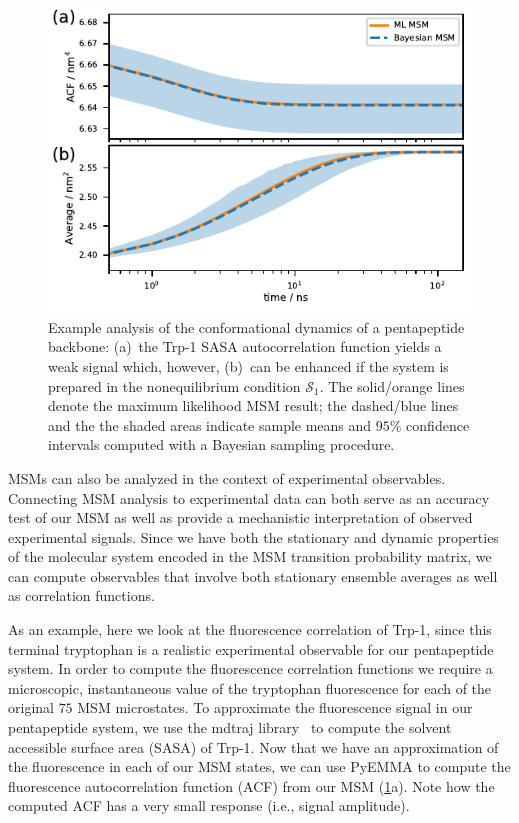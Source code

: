 \documentclass[9pt,tutorial]{livecoms}
\begin{document}
\begin{figure}
\includegraphics{figure_5}
\caption{Example analysis of the conformational dynamics of a pentapeptide backbone: (a)~the Trp-1 SASA autocorrelation function yields a weak signal which, however, (b)~can be enhanced if the system is prepared in the nonequilibrium condition $\mathcal{S}_1$. The solid/orange lines denote the maximum likelihood MSM result; the dashed/blue lines and the the shaded areas indicate sample means and $95\%$ confidence intervals computed with a Bayesian sampling procedure.}
\label{fig:msm-exp-obs}
\end{figure}

MSMs can also be analyzed in the context of experimental observables. Connecting MSM analysis to experimental data can both serve as an accuracy test of our MSM as well as provide a mechanistic interpretation of observed experimental signals.
Since we have both the stationary and dynamic properties of the molecular system encoded in the MSM transition probability matrix, we can compute observables that involve both stationary ensemble averages as well as correlation functions.

As an example, here we look at the fluorescence correlation of Trp-1, since this terminal tryptophan is a realistic experimental observable for our pentapeptide system.
In order to compute the fluorescence correlation functions we require a microscopic, instantaneous value of the tryptophan fluorescence for each of the original $75$ MSM microstates.
To approximate the fluorescence signal in our pentapeptide system, we use the mdtraj library~\cite{mdtraj} to compute the solvent accessible surface area (SASA) of Trp-1.
Now that we have an approximation of the fluorescence in each of our MSM states, we can use PyEMMA to compute the fluorescence autocorrelation function (ACF) from our MSM (\ref{fig:msm-exp-obs}a).
Note how the computed ACF has a very small response (i.e., signal amplitude).
\end{document}
